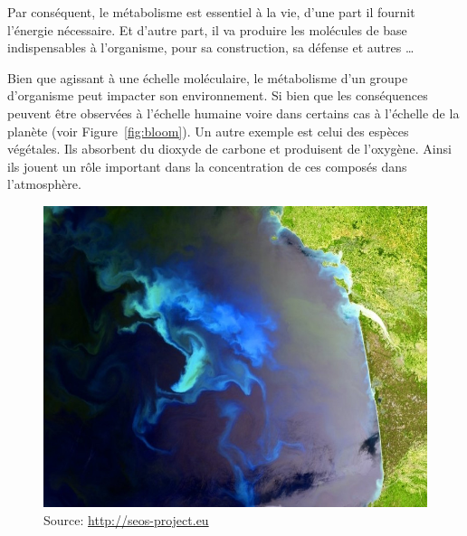 \begin{refsection}
    Par conséquent, le métabolisme est essentiel à la vie, d'une part il fournit l'énergie nécessaire. Et d'autre part, il va produire les molécules de base indispensables à l'organisme, pour sa construction, sa défense et autres \ldots
    
    Bien que agissant à une échelle moléculaire, le métabolisme d'un groupe d'organisme peut impacter son environnement. Si bien que les conséquences peuvent être observées à l'échelle humaine voire dans certains cas à l'échelle de la planète (voir Figure~\ref{fig:bloom}). Un autre exemple est celui des espèces végétales. Ils absorbent du dioxyde de carbone et produisent de l'oxygène. Ainsi ils jouent un rôle important dans la concentration de ces composés dans l’atmosphère.
    
    
    \begin{shadedfigure}
        \begin{subfigure}[b]{.5\textwidth}
            \centering
            \includegraphics[width=\textwidth]{img/bloom_gascogne.jpg}
            \caption{{\tiny Source: \url{http://seos-project.eu}}}
            \label{fig:bloom_gascogne}
        \end{subfigure}
        \hfill
        \begin{subfigure}[b]{.5\textwidth}
            \centering

\end{subfigure}
\end{shadedfigure}
\end{refsection}
